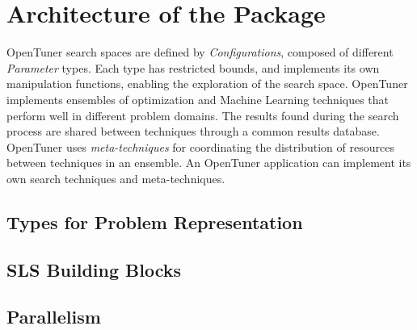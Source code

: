\section{Architecture of the Package}
\label{sec:arch}

OpenTuner search spaces are defined by \emph{Configurations}, composed of
different \emph{Parameter} types. Each type has restricted bounds, and
implements its own manipulation functions, enabling the exploration of the
search space.  OpenTuner implements ensembles of optimization and Machine
Learning techniques that perform well in different problem domains.  The
results found during the search process are shared between techniques through a
common results database. OpenTuner uses \emph{meta-techniques} for coordinating
the distribution of resources between techniques in an ensemble.  An OpenTuner
application can implement its own search techniques and meta-techniques.

\subsection{Types for Problem Representation}
\subsection{SLS Building Blocks}
\subsection{Parallelism}


